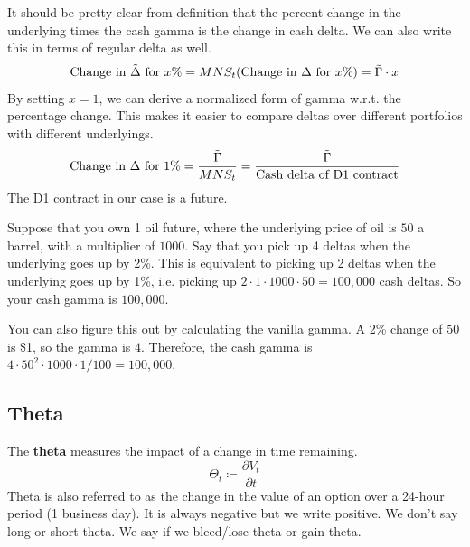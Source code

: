\documentclass{article}
\begin{document}
    \begin{theorem}
      It should be pretty clear from definition that the percent change in the underlying times the cash gamma is the change in cash delta. We can also write this in terms of regular delta as well. 
      \begin{equation}
        \text{Change in } \Tilde{\Delta} \text{ for } x\% = M N S_t (\text{Change in } \Delta \text{ for } x\%) = \Tilde{\Gamma} \cdot x
      \end{equation}
      By setting $x = 1$, we can derive a normalized form of gamma w.r.t. the percentage change. This makes it easier to compare deltas over different portfolios with different underlyings. 
      \begin{equation}
        \text{Change in } \Delta \text{ for } 1\% = \frac{\Tilde{\Gamma}}{M N S_t} = \frac{\Tilde{\Gamma}}{\text{Cash delta of D1 contract}}
      \end{equation}
      The D1 contract in our case is a future. 
    \end{theorem}

    \begin{example}
      Suppose that you own 1 oil future, where the underlying price of oil is $50$ a barrel, with a multiplier of $1000$. Say that you pick up 4 deltas when the underlying goes up by 2\%. This is equivalent to picking up 2 deltas when the underlying goes up by 1\%, i.e. picking up $2 \cdot 1 \cdot 1000 \cdot 50 = 100,000$ cash deltas. So your cash gamma is $100,000$. 

      You can also figure this out by calculating the vanilla gamma. A 2\% change of $50$ is \$1, so the gamma is $4$. Therefore, the cash gamma is $4 \cdot 50^2 \cdot 1000 \cdot 1 / 100 = 100,000$. 
    \end{example}

  \subsection{Theta}

    \begin{definition}[Theta]
      The \textbf{theta} measures the impact of a change in time remaining. 
      \begin{equation}
        \Theta_t \coloneqq \frac{\partial V_t}{\partial t}
      \end{equation}
      Theta is also referred to as the change in the value of an option over a 24-hour period (1 business day). It is always negative but we write positive. We don't say long or short theta. We say if we bleed/lose theta or gain theta.
    \end{definition}
\end{document}
